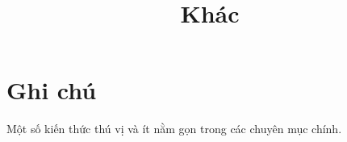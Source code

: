 \documentclass[11pt]{article}
\title{Khác}
\author{}
\date{}
\begin{document}
\maketitle

\section*{Ghi chú}

Một số kiến thức thú vị và ít nằm gọn trong các chuyên mục chính.
\end{document}
